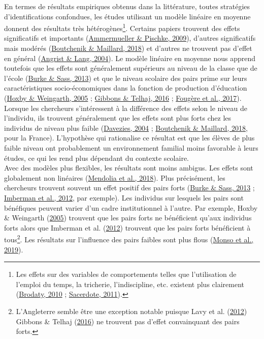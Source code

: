 \documentclass[
]{book}
\begin{document}
\quad En termes de résultats empiriques obtenus dans la littérature, toutes stratégies d'identifications confondues, les études utilisant un modèle linéaire en moyenne donnent des résultats très hétérogènes\footnote{Les effets sur des variables de comportements telles que l'utilisation de l'emploi du temps, la tricherie, l'indiscipline, etc. existent plus clairement (\protect\hyperlink{ref-BRO:10}{Brodaty, 2010} ; \protect\hyperlink{ref-SAC:11}{Sacerdote, 2011}).}. Certains papiers trouvent des effets significatifs et importants (\protect\hyperlink{ref-AMM:PIS:09}{Ammermueller \& Pischke, 2009}), d'autres significatifs mais modérés (\protect\hyperlink{ref-BOU:MAI:18}{Boutchenik \& Maillard, 2018}) et d'autres ne trouvent pas d'effet en général (\protect\hyperlink{ref-ANG:LAN:04}{Angrist \& Lang, 2004}). Le modèle linéaire en moyenne nous apprend toutefois que les effets sont généralement supérieurs au niveau de la classe que de l'école (\protect\hyperlink{ref-BUR:SAS:13}{Burke \& Sass, 2013}) et que le niveau scolaire des pairs prime sur leurs caractéristiques socio-économiques dans la fonction de production d'éducation (\protect\hyperlink{ref-HOX:WEI:05}{Hoxby \& Weingarth, 2005} ; \protect\hyperlink{ref-GIB:TEL:16}{Gibbons \& Telhaj, 2016} ; \protect\hyperlink{ref-FOU:eal:17}{Fougère et al., 2017}). Lorsque les chercheurs s'intéressent à la différence des effets selon le niveau de l'individu, ils trouvent généralement que les effets sont plus forts chez les individus de niveau plus faible (\protect\hyperlink{ref-DAV:04}{Davezies, 2004} ; \protect\hyperlink{ref-BOU:MAI:18}{Boutchenik \& Maillard, 2018}, pour la France). L'hypothèse qui rationalise ce résultat est que les élèves de plus faible niveau ont probablement un environnement familial moins favorable à leurs études, ce qui les rend plus dépendant du contexte scolaire.\\
Avec des modèles plus flexibles, les résultats sont moins ambigus. Les effets sont globalement non linéaires (\protect\hyperlink{ref-MEN:eal:18}{Mendolia et al., 2018}). Plus précisément, les chercheurs trouvent souvent un effet positif des pairs forts (\protect\hyperlink{ref-BUR:SAS:13}{Burke \& Sass, 2013} ; \protect\hyperlink{ref-IMB:eal:12}{Imberman et al., 2012}, par exemple). Les individus sur lesquels les pairs sont bénéfiques peuvent varier d'un cadre institutionnel à l'autre. Par exemple, Hoxby \& Weingarth (\protect\hyperlink{ref-HOX:WEI:05}{2005}) trouvent que les pairs forts ne bénéficient qu'aux individus forts alors que Imberman et al. (\protect\hyperlink{ref-IMB:eal:12}{2012}) trouvent que les pairs forts bénéficient à tous\footnote{L'Angleterre semble être une exception notable puisque Lavy et al. (\protect\hyperlink{ref-LAV:eal:12}{2012}) Gibbons \& Telhaj (\protect\hyperlink{ref-GIB:TEL:16}{2016}) ne trouvent pas d'effet convainquant des pairs forts.}. Les résultats sur l'influence des pairs faibles sont plus flous (\protect\hyperlink{ref-MON:eal:19}{Monso et al., 2019}).\\
\end{document}
